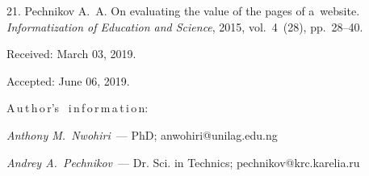 {21. Pechnikov A.~A. On evaluating the value of the pages of
a~website. \emph{Informatiza\-tion of Education and Science},
2015, vol.~4~(28), pp.~28--40.


\vskip 1.5mm

%

Received: March 03, 2019.

Accepted: June 06, 2019.

\vskip6mm A\,u\,t\,h\,o\,r's \ i\,n\,f\,o\,r\,m\,a\,t\,i\,o\,n:

\vskip1.5mm%
\textit{Anthony M.~Nwohiri}~--- PhD; anwohiri@unilag.edu.ng

\vskip1.5mm%
\textit{Andrey A.~Pechnikov}~--- Dr. Sci. in Technics;
pechnikov@krc.karelia.ru

}
